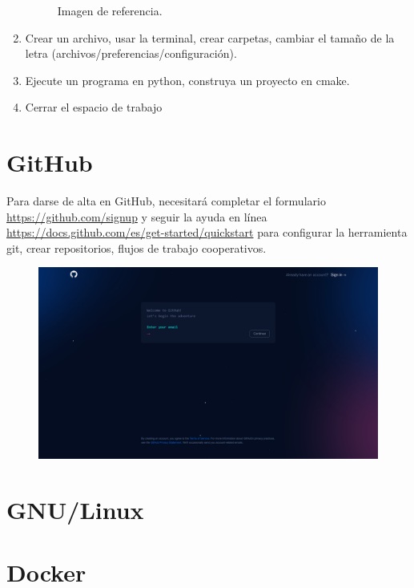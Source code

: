 \begin{enumerate}
\begin{figure}[ht!]
		      \caption{Imagen de referencia.}
	      \end{figure}
	\item Crear un archivo, usar la terminal, crear carpetas, cambiar el tamaño de la letra (archivos/preferencias/configuración).
	\item Ejecute un programa en python, construya un proyecto en cmake.
	\item Cerrar el espacio de trabajo
\end{enumerate}


\section{GitHub}

Para darse de alta en GitHub, necesitará completar el formulario \url{https://github.com/signup} y seguir la ayuda en línea \url{https://docs.github.com/es/get-started/quickstart} para configurar la herramienta git, crear repositorios, flujos de trabajo cooperativos.

\begin{figure}[ht!]
	\centering
	\includegraphics[width=.6\paperwidth]{images/signup}
\end{figure}

\section{GNU/Linux}

\section{Docker}

